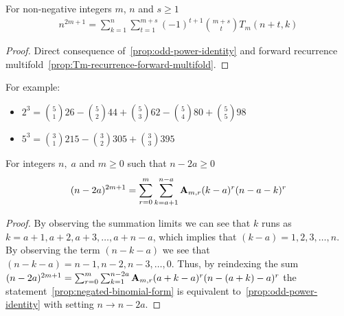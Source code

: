 \begin{proposition}
    \label{prop:odd-power-decomposition-forward-multifold}
    For non-negative integers $m$, $n$ and $s \geq 1$
    \begin{align*}
        n^{2m+1} = \sum_{k=1}^{n} \sum_{t=1}^{m+s} (-1)^{t+1} \binom{m+s}{t} T_{m} (n+t, k)
    \end{align*}
    \begin{proof}
        Direct consequence of~\eqref{prop:odd-power-identity}
        and forward recurrence multifold~\eqref{prop:Tm-recurrence-forward-multifold}.
    \end{proof}
\end{proposition}
For example:
\begin{itemize}
    \item $2^3 = \binom{5}{1} 26 - \binom{5}{2}44 + \binom{5}{3} 62 - \binom{5}{4}80+\binom{5}{5}98$
    \item $5^3 = \binom{3}{1} 215 - \binom{3}{2} 305 + \binom{3}{3} 395$
\end{itemize}
\begin{proposition}
    \label{prop:negated-binomial-form}
    For integers $n, \; a$ and $m\geq 0$ such that $n-2a \geq 0$
    \begin{align*}
    (n-2a)
        ^{2m+1} = \sum_{r=0}^{m} \sum_{k=a+1}^{n-a} {\mathbf{A}} \sb{m,r} (k-a)^r (n-a-k)^r
    \end{align*}
    \begin{proof}
        By observing the summation limits we can see that $k$ runs as $k=a+1,a+2,a+3,\ldots,a+n-a$, which
        implies that $(k-a)=1,2,3,\ldots, n$.
        By observing the term $(n-k-a)$ we see that $(n-k-a)=n-1,n-2,n-3,\ldots,0$.
        Thus, by reindexing the sum
        $(n-2a)^{2m+1} = \sum_{r=0}^{m} \sum_{k=1}^{n-2a} {\mathbf{A}} \sb{m,r} (a+k-a)^r (n-(a+k)-a)^r$
        the statement~\eqref{prop:negated-binomial-form} is equivalent to~\eqref{prop:odd-power-identity}
        with setting $n \rightarrow n-2a$.
    \end{proof}
\end{proposition}
